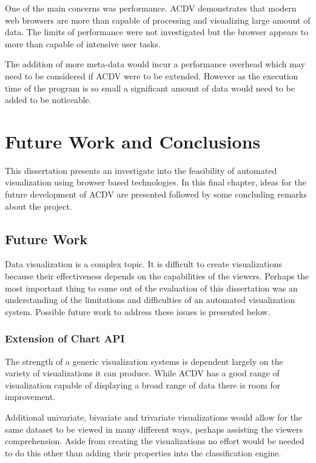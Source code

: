 \documentclass[a4paper, 11pt, titlepage, onehalfspacing]{report}
\begin{document}
One of the main concerns was performance. AC\lightning{}DV demonstrates that modern web browsers are more than capable of processing and visualizing large amount of data. The limits of performance were not investigated but the browser appears to more than capable of intensive user tasks.

The addition of more meta-data would incur a performance overhead which may need to be considered if AC\lightning{}DV were to be extended. However as the execution time of the program is so small a significant amount of data would need to be added to be noticeable.




\chapter{Future Work and Conclusions}
\label{future}
This dissertation presents an investigate into the feasibility of automated visualization using browser based technologies. In this final chapter, ideas for the future development of AC\lightning{}DV are presented followed by some concluding remarks about the project.

\section{Future Work}
Data visualization is a complex topic. It is difficult to create visualizations because their effectiveness depends on the capabilities of the viewers. Perhaps the most important thing to come out of the evaluation of this dissertation was an understanding of the limitations and difficulties of an automated visualization system. Possible future work to address these issues is presented below.

\subsection{Extension of Chart API}
The strength of a generic visualization systems is dependent largely on the variety of visualizations it can produce. While AC\lightning{}DV has a good range of visualization capable of displaying a broad range of data there is room for improvement. 

Additional univariate, bivariate and trivariate visualizations would allow for the same dataset to be viewed in many different ways, perhaps assisting the viewers comprehension. Aside from creating the visualizations no effort would be needed to do this other than adding their properties into the classification engine.
\end{document}
